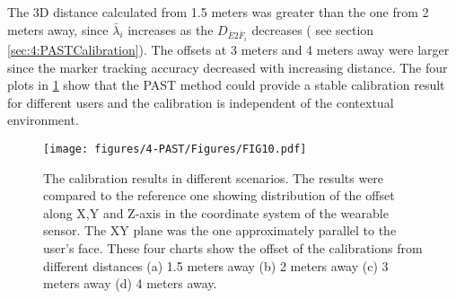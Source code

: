 The 3D distance calculated from 1.5 meters was greater than the one from 2 meters away, since $\bar\lambda_i$ increases as the $ D_{\bar E2 \bar F_i}$ decreases ( see section \ref{sec:4:PASTCalibration}).  
The offsets at 3 meters and 4 meters away were larger since the marker tracking accuracy decreased with increasing distance. The four plots in \figurename{ \ref{fig:PAST}} show that the PAST method could provide a stable calibration result for different users and the calibration is independent of the contextual environment. 
\begin{figure}
	\centering
	\texttt{[image: figures/4-PAST/Figures/FIG10.pdf]}
	\caption{The calibration results in different scenarios. The results were compared to the reference one showing distribution of the offset along X,Y and Z-axis in the coordinate system of the wearable sensor. The XY plane was the one approximately parallel to the user's face. These four charts show the offset of the calibrations from different distances (a) 1.5 meters away (b) 2 meters away (c) 3 meters away (d) 4 meters away.}
	\label{fig:PAST}
\end{figure}

